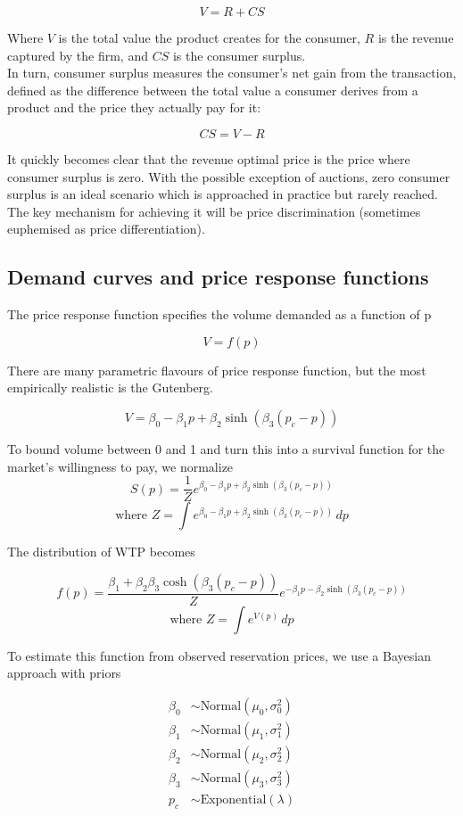 \documentclass{article}
\begin{document}
\[
V = R + CS
\]

Where \( V \) is the total value the product creates for the consumer, \( R \) is the revenue captured by the firm, and \( CS \) is the consumer surplus. \\

In turn, consumer surplus measures the consumer's net gain from the transaction, defined as the difference between the total value a consumer derives from a product  and the price they actually pay for it:

\[
CS = V - R
\]


It quickly becomes clear that the revenue optimal price is the price where consumer surplus is zero. With the possible exception of auctions, zero consumer surplus is an ideal scenario which is approached in practice but rarely reached. The key mechanism for achieving it will be price discrimination (sometimes euphemised as price differentiation). \\

\subsection{Demand curves and price response functions} 

The price response function specifies the volume demanded as a function of p

\[
V = f(p)
\]

There are many parametric flavours of price response function, but the most empirically realistic is the Gutenberg. 

\[
V = \beta_0 - \beta_1 p + \beta_2  \sinh (\beta_3(p_c - p))
\]

To bound volume between 0 and 1 and turn this into a survival function for the market's willingness to pay, we normalize
\[
S(p) = \frac{1}{Z} e^{\beta_0 - \beta_1 p + \beta_2  \sinh (\beta_3(p_c - p))}
\]
\[
\text{where } Z = \int e^{\beta_0 - \beta_1 p + \beta_2  \sinh (\beta_3(p_c - p))} \, dp
\]


The distribution of WTP becomes

\[
f(p) = \frac{\beta_1 + \beta_2 \beta_3 \cosh(\beta_3(p_c - p))}{Z} e^{-\beta_1 p - \beta_2 \sinh(\beta_3(p_c - p))}
\]
\[
\text{where } Z = \int e^{V(p)} \, dp
\]



To estimate this function from observed reservation prices, we use a Bayesian approach with priors

\begin{align*}
\beta_0 &\sim \text{Normal}(\mu_0, \sigma_0^2) \\
\beta_1 &\sim \text{Normal}(\mu_1, \sigma_1^2) \\
\beta_2 &\sim \text{Normal}(\mu_2, \sigma_2^2) \\
\beta_3 &\sim \text{Normal}(\mu_3, \sigma_3^2) \\
p_c &\sim \text{Exponential}(\lambda)
\end{align*}
\end{document}
